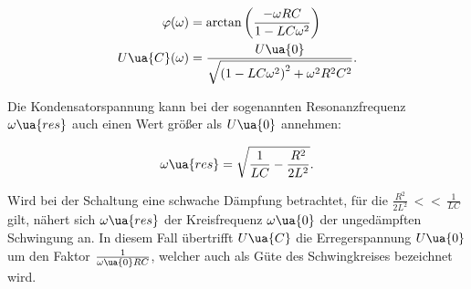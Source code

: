 \begin{align}
  \varphi(\omega) &= \arctan \left( \frac{-\omega RC}{1 - LC\omega^2} \right) \\
  U\ua{C}(\omega) &= \frac{U\ua{0}}{ \sqrt{ \left(1 - LC\omega^2 \right)^2 + \omega^2R^2C^2}} .
\end{align}

Die Kondensatorspannung kann bei der sogenannten Resonanzfrequenz $\omega\ua{res}$
auch einen Wert größer als $U\ua{0}$ annehmen:

\begin{equation}
  \omega\ua{res} = \sqrt{\frac{1}{LC} - \frac{R^2}{2L^2}} .
\end{equation}

Wird bei der Schaltung eine schwache Dämpfung betrachtet, für die
$\frac{R^2}{2L^2} \, << \, \frac{1}{LC}$ gilt, nähert sich $\omega\ua{res}$
der Kreisfrequenz $\omega\ua{0}$ der ungedämpften Schwingung an. In diesem
Fall übertrifft $U\ua{C}$ die Erregerspannung $U\ua{0}$ um den Faktor
$\frac{1}{\omega\ua{0}RC}$, welcher auch als Güte des Schwingkreises bezeichnet wird.




